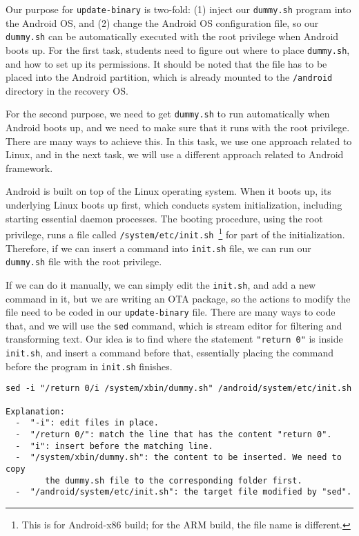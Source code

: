 Our purpose for \texttt{update-binary} is two-fold: (1) inject our \texttt{dummy.sh} program
into the Android OS, and (2) change the Android OS configuration file, so 
our \texttt{dummy.sh} can be automatically executed with the root privilege
when Android boots up. For the first task, students need to figure out
where to place \texttt{dummy.sh}, and how to set up its permissions. 
It should be noted that the file has to be placed into the Android
partition, which is already mounted to the \texttt{/android} directory in
the recovery OS. 


For the second purpose, we need to get \texttt{dummy.sh} to run
automatically when Android boots up, and we need to make sure that it runs
with the root privilege. There are many ways to achieve this. In this task,
we use one approach related to Linux, and in the next task, we will use a different
approach related to Android framework.

Android is built on top of the Linux operating system. When it boots
up, its underlying Linux boots up first, which conducts system
initialization, including starting essential daemon processes.  
The booting procedure, using the root privilege, runs a file called 
\texttt{/system/etc/init.sh}~\footnote{This is
for Android-x86 build; for the ARM build, the file name is different.} 
for part of the initialization. Therefore, if we can insert a command 
into \texttt{init.sh} file, we can run our \texttt{dummy.sh} file with the
root privilege. 

If we can do it manually, we can simply edit the \texttt{init.sh}, and add
a new command in it, but we are writing an OTA package, so the actions
to modify the file need to be coded in our \texttt{update-binary}
file. There are many ways to code that, and we will use the \texttt{sed}
command, which is stream editor for filtering and transforming text. 
Our idea is to find where the statement \texttt{"return 0"} is inside \texttt{init.sh},
and insert a command before that, essentially placing the command before 
the program in \texttt{init.sh} finishes.  

\begin{lstlisting}[frame=single, caption={}, label=label]
sed -i "/return 0/i /system/xbin/dummy.sh" /android/system/etc/init.sh

Explanation: 
  -  "-i": edit files in place.
  -  "/return 0/": match the line that has the content "return 0".
  -  "i": insert before the matching line.
  -  "/system/xbin/dummy.sh": the content to be inserted. We need to copy
        the dummy.sh file to the corresponding folder first.
  -  "/android/system/etc/init.sh": the target file modified by "sed".
\end{lstlisting}


